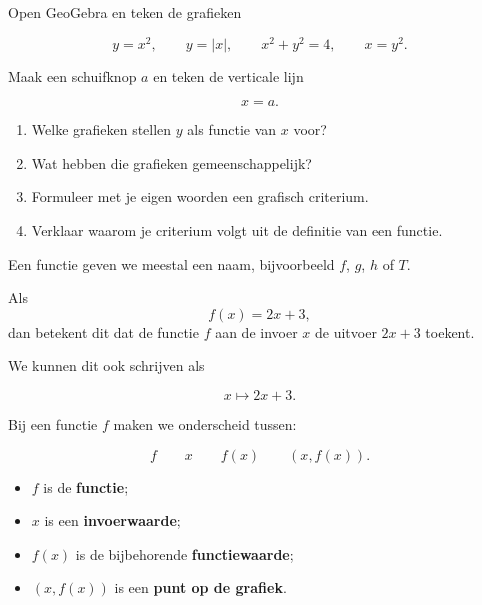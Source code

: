 \documentclass{ximera}
\begin{document}
\begin{fvdgeogebra}

    Open GeoGebra en teken de grafieken
    
    \[
    y=x^2,
    \qquad
    y=|x|,
    \qquad
    x^2+y^2=4,
    \qquad
    x=y^2.
    \]
    
    Maak een schuifknop \(a\) en teken de verticale lijn
    
    \[
    x=a.
    \]
    
    \begin{enumerate}
        \item Welke grafieken stellen \(y\) als functie van \(x\) voor?
        \item Wat hebben die grafieken gemeenschappelijk?
        \item Formuleer met je eigen woorden een grafisch criterium.
        \item Verklaar waarom je criterium volgt uit de definitie van een functie.
    \end{enumerate}
    
    \end{fvdgeogebra}



Een functie geven we meestal een naam, bijvoorbeeld \(f\), \(g\), \(h\) of \(T\).

Als
\[
f(x)=2x+3,
\]
dan betekent dit dat de functie \(f\) aan de invoer \(x\) de uitvoer
\(2x+3\) toekent.

We kunnen dit ook schrijven als

\[
x\longmapsto 2x+3.
\]

\begin{opmerking}

Bij een functie \(f\) maken we onderscheid tussen:

\[
\boxed{f}
\qquad
\boxed{x}
\qquad
\boxed{f(x)}
\qquad
\boxed{(x,f(x))}.
\]

\begin{itemize}
    \item \(f\) is de \textbf{functie};
    \item \(x\) is een \textbf{invoerwaarde};
    \item \(f(x)\) is de bijbehorende \textbf{functiewaarde};
    \item \((x,f(x))\) is een \textbf{punt op de grafiek}.
\end{itemize}
\end{opmerking}
\end{document}

